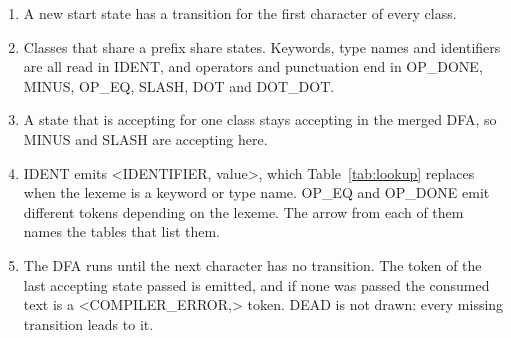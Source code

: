 \begin{enumerate}
    \item A new start state has a transition for the first character of
    every class.
    \item Classes that share a prefix share states. Keywords, type names
    and identifiers are all read in IDENT, and operators and punctuation
    end in OP\_DONE, MINUS, OP\_EQ, SLASH, DOT and DOT\_DOT.
    \item A state that is accepting for one class stays accepting in the
    merged DFA, so MINUS and SLASH are accepting here.
    \item IDENT emits \textless IDENTIFIER, value\textgreater, which
    Table~\ref{tab:lookup} replaces when the lexeme is a keyword or type
    name. OP\_EQ and OP\_DONE emit different tokens depending on the
    lexeme. The arrow from each of them names the tables that list them.
    \item The DFA runs until the next character has no transition. The
    token of the last accepting state passed is emitted, and if none was
    passed the consumed text is a \textless COMPILER\_ERROR,\textgreater{}
    token. DEAD is not drawn: every missing transition leads to it.
\end{enumerate}

